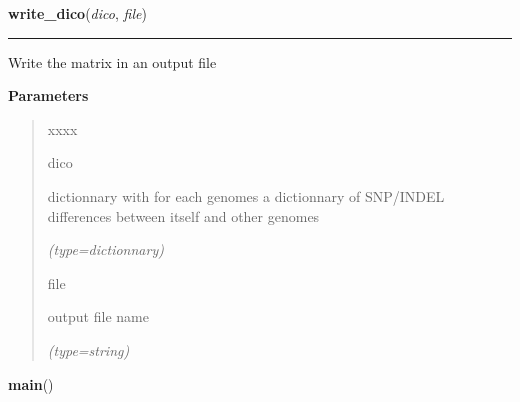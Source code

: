     \label{script-VCFtoMATRIX:write_dico}

    \vspace{0.5ex}

\hspace{.8\funcindent}\begin{boxedminipage}{\funcwidth}

    \raggedright \textbf{write\_dico}(\textit{dico}, \textit{file})

    \vspace{-1.5ex}

    \rule{\textwidth}{0.5\fboxrule}
\setlength{\parskip}{2ex}
    Write the matrix in an output file

\setlength{\parskip}{1ex}
      \textbf{Parameters}
      \vspace{-1ex}

      \begin{quote}
        \begin{Ventry}{xxxx}

          \item[dico]

          dictionnary with for each genomes a dictionnary of SNP/INDEL 
          differences between itself and other genomes

            {\it (type=dictionnary)}

          \item[file]

          output file name

            {\it (type=string)}

        \end{Ventry}

      \end{quote}

    \end{boxedminipage}

    \label{script-VCFtoMATRIX:main}

    \vspace{0.5ex}

\hspace{.8\funcindent}\begin{boxedminipage}{\funcwidth}

    \raggedright \textbf{main}()

\setlength{\parskip}{2ex}
\setlength{\parskip}{1ex}
    \end{boxedminipage}


